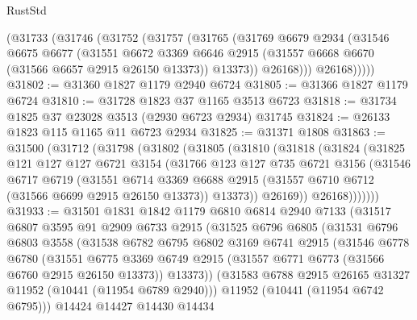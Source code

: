 \begin{lexlean}{RustStd}
\begin{coremodule}
        (@31733
          (@31746
            (@31752
              (@31757
                (@31765
                  (@31769
                    @6679
                    @2934
                    (@31546
                      @6675
                      @6677
                      (@31551
                        @6672
                        @3369
                        @6646
                        @2915
                        (@31557 @6668 @6670 (@31566 @6657 @2915 @26150 @13373))
                        @13373))
                    @26168)))
              @26168)))))
@31802 := @31360 @1827 @1179 @2940 @6724
@31805 := @31366 @1827 @1179 @6724
@31810 := @31728 @1823 @37 @1165 @3513 @6723
@31818 := @31734 @1825 @37 @23028 @3513 (@2930 @6723 @2934) @31745
@31824 := @26133 @1823 @115 @1165 @11 @6723 @2934
@31825 := @31371 @1808
@31863 := @31500
    (@31712
      (@31798
        (@31802
          (@31805
            (@31810
              (@31818
                (@31824
                  (@31825
                    @121
                    @127
                    @127
                    @6721
                    @3154
                    (@31766
                      @123
                      @127
                      @735
                      @6721
                      @3156
                      (@31546
                        @6717
                        @6719
                        (@31551
                          @6714
                          @3369
                          @6688
                          @2915
                          (@31557 @6710 @6712 (@31566 @6699 @2915 @26150 @13373))
                          @13373))
                      @26169))
                  @26168)))))))
@31933 := @31501
    @1831
    @1842
    @1179
    @6810
    @6814
    @2940
    @7133
    (@31517
      @6807
      @3595
      @91
      @2909
      @6733
      @2915
      (@31525
        @6796
        @6805
        (@31531
          @6796
          @6803
          @3558
          (@31538
            @6782
            @6795
            @6802
            @3169
            @6741
            @2915
            (@31546
              @6778
              @6780
              (@31551
                @6775
                @3369
                @6749
                @2915
                (@31557 @6771 @6773 (@31566 @6760 @2915 @26150 @13373))
                @13373))
            (@31583 @6788 @2915 @26165 @31327 @11952 (@10441 (@11954 @6789 @2940)))
            @11952
            (@10441 (@11954 @6742 @6795)))
          @14424
          @14427
          @14430
          @14434

\end{coremodule}
\end{lexlean}
